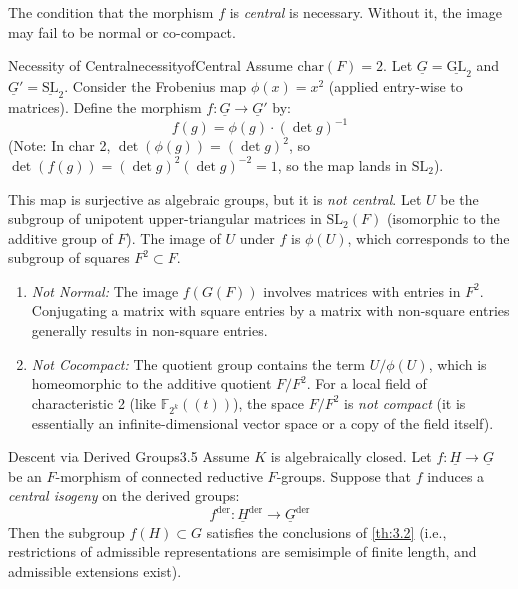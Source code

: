 \documentclass{article}
\let\temp\phi
\let\phi\varphi
\let\varphi\temp
\begin{document}
  The condition that the morphism $f$ is \emph{central} is necessary. Without it, the image may fail to be normal or co-compact.

\begin{example}{Necessity of Central}{necessityofCentral}
  Assume $\mathrm{char}(F) = 2$. Let $\underline{G} = \underline{\mathrm{GL}}_2$ and $\underline{G}' = \underline{\mathrm{SL}}_2$.
  Consider the Frobenius map $\varphi(x) = x^2$ (applied entry-wise to matrices).
  Define the morphism $f: \underline{G} \to \underline{G}'$ by:
  \[ f(g) = \varphi(g) \cdot (\det g)^{-1} \]
  (Note: In char 2, $\det(\varphi(g)) = (\det g)^2$, so $\det(f(g)) = (\det g)^2 (\det g)^{-2} = 1$, so the map lands in $\mathrm{SL}_2$).

  This map is surjective as algebraic groups, but it is \emph{not central}.
  Let $U$ be the subgroup of unipotent upper-triangular matrices in $\mathrm{SL}_2(F)$ (isomorphic to the additive group of $F$).
  The image of $U$ under $f$ is $\varphi(U)$, which corresponds to the subgroup of squares $F^2 \subset F$.
  \begin{enumerate}
      \item \emph{Not Normal:} The image $f(G(F))$ involves matrices with entries in $F^2$. Conjugating a matrix with square entries by a matrix with non-square entries generally results in non-square entries.
      \item \emph{Not Cocompact:} The quotient group contains the term $U / \varphi(U)$, which is homeomorphic to the additive quotient $F / F^2$. For a local field of characteristic 2 (like $\mathbb{F}_{2^k}((t))$), the space $F/F^2$ is \emph{not compact} (it is essentially an infinite-dimensional vector space or a copy of the field itself).
  \end{enumerate}
\end{example}


\begin{cor}{Descent via Derived Groups}{3.5}
Assume \(K\) is algebraically closed. Let \(f: \underline{H} \to \underline{G}\) be an \(F\)-morphism of connected reductive \(F\)-groups.
Suppose that \(f\) induces a \emph{central isogeny} on the derived groups:
\[ f^{\mathrm{der}}: \underline{H}^{\mathrm{der}} \to \underline{G}^{\mathrm{der}} \]
Then the subgroup \(f(H) \subset G\) satisfies the conclusions of \cref{th:3.2} (i.e., restrictions of admissible representations are semisimple of finite length, and admissible extensions exist).
\end{cor}
\end{document}
